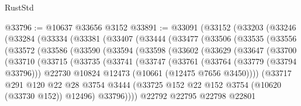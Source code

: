 \begin{lexlean}{RustStd}
\begin{coremodule}
@33796 := @10637 @33656 @3152
@33891 := @33091
    (@33152
      (@33203
        (@33246
          (@33284
            (@33334
              (@33381
                (@33407
                  (@33444
                    (@33477
                      (@33506
                        (@33535
                          (@33556
                            (@33572
                              (@33586
                                (@33590
                                  (@33594
                                    (@33598
                                      (@33602
                                        (@33629
                                          (@33647
                                            (@33700
                                              (@33710
                                                (@33715
                                                  (@33735
                                                    (@33741
                                                      (@33747
                                                        (@33761
                                                          (@33764 (@33779 (@33794 @33796)))
                                                          @22730
                                                          @10824
                                                          @12473
                                                          (@10661 (@12475 @7656 @3450))))
                                                      (@33717
                                                        @291
                                                        @120
                                                        @22
                                                        @28
                                                        @3754
                                                        @3444
                                                        (@33725
                                                          @152
                                                          @22
                                                          @152
                                                          @3754
                                                          (@10620 (@33730 @152))
                                                          @12496)
                                                        @33796))))
                                                @22792
                                                @22795
                                                @22798
                                                @22801

\end{coremodule}
\end{lexlean}
